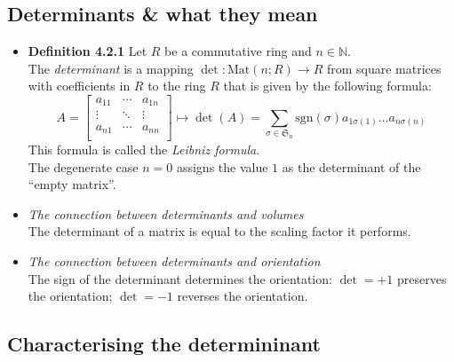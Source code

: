 \documentclass[11pt,a4paper]{article}
\begin{document}
\subsection{Determinants \& what they mean}

\begin{itemize}
    \item \textbf{Definition 4.2.1}
        Let $R$ be a commutative ring and $n \in \mathbb{N}$. \\
        The \emph{determinant} is a mapping
        $\det : \mathrm{Mat}(n;R) \to R$ from square matrices with coefficients in $R$
        to the ring $R$ that is given by the following formula:
        \[
            A =
            \begin{bmatrix}
                a_{11} & \cdots & a_{1n} \\
                \vdots & \ddots & \vdots \\
                a_{n1} & \cdots & a_{nn} \\
            \end{bmatrix}
            \mapsto \det (A) =
            \sum_{\sigma \in \mathfrak{S}_n}
            \mathrm{sgn}(\sigma) a_{1\sigma(1)} \ldots a_{n\sigma(n)}
        \]
        This formula is called the \emph{Leibniz formula}. \\
        The degenerate case $n=0$ assigns the value $1$ as the determinant of the ``empty matrix''.

    \item \emph{The connection between determinants and volumes} \\
        The determinant of a matrix is equal to the scaling factor it performs.

    \item \emph{The connection between determinants and orientation} \\
        The sign of the determinant determines the orientation:
        $\det = +1$ preserves the orientation;
        $\det = -1$ reverses the orientation.

\end{itemize}

\subsection{Characterising the determininant}
\end{document}

